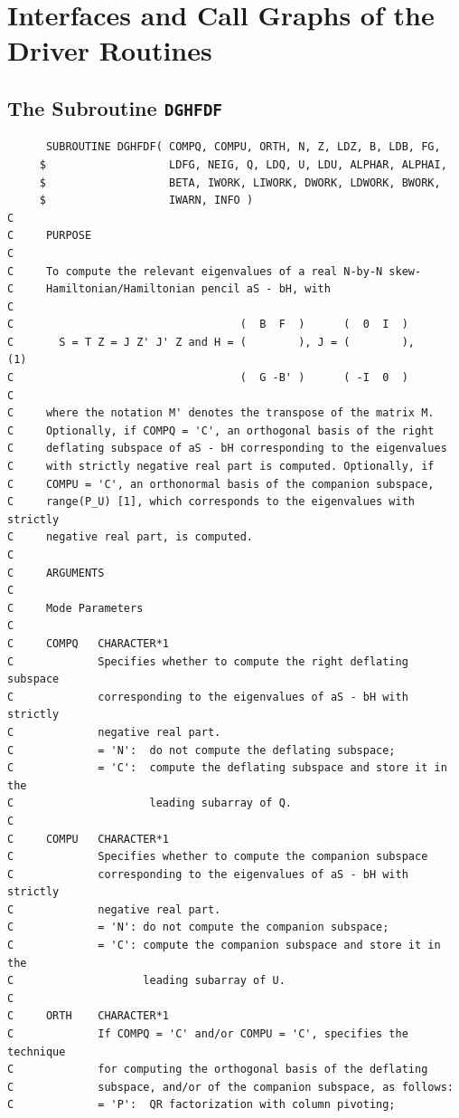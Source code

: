 \documentclass[a4paper,10pt]{article}
\begin{document}
\section{Interfaces and Call Graphs of the Driver Routines}
%
\subsection{The Subroutine \texttt{DGHFDF}}
%
\footnotesize
\begin{verbatim}
      SUBROUTINE DGHFDF( COMPQ, COMPU, ORTH, N, Z, LDZ, B, LDB, FG,
     $                   LDFG, NEIG, Q, LDQ, U, LDU, ALPHAR, ALPHAI,
     $                   BETA, IWORK, LIWORK, DWORK, LDWORK, BWORK,
     $                   IWARN, INFO )
C
C     PURPOSE
C
C     To compute the relevant eigenvalues of a real N-by-N skew-
C     Hamiltonian/Hamiltonian pencil aS - bH, with
C
C                                   (  B  F  )      (  0  I  )
C       S = T Z = J Z' J' Z and H = (        ), J = (        ),      (1)
C                                   (  G -B' )      ( -I  0  )
C
C     where the notation M' denotes the transpose of the matrix M.
C     Optionally, if COMPQ = 'C', an orthogonal basis of the right
C     deflating subspace of aS - bH corresponding to the eigenvalues
C     with strictly negative real part is computed. Optionally, if
C     COMPU = 'C', an orthonormal basis of the companion subspace,
C     range(P_U) [1], which corresponds to the eigenvalues with strictly
C     negative real part, is computed.
C
C     ARGUMENTS
C
C     Mode Parameters
C
C     COMPQ   CHARACTER*1
C             Specifies whether to compute the right deflating subspace
C             corresponding to the eigenvalues of aS - bH with strictly
C             negative real part.
C             = 'N':  do not compute the deflating subspace;
C             = 'C':  compute the deflating subspace and store it in the
C                     leading subarray of Q.
C
C     COMPU   CHARACTER*1
C             Specifies whether to compute the companion subspace
C             corresponding to the eigenvalues of aS - bH with strictly
C             negative real part.
C             = 'N': do not compute the companion subspace;
C             = 'C': compute the companion subspace and store it in the
C                    leading subarray of U.
C
C     ORTH    CHARACTER*1
C             If COMPQ = 'C' and/or COMPU = 'C', specifies the technique
C             for computing the orthogonal basis of the deflating
C             subspace, and/or of the companion subspace, as follows:
C             = 'P':  QR factorization with column pivoting;

\end{verbatim}
\end{document}
